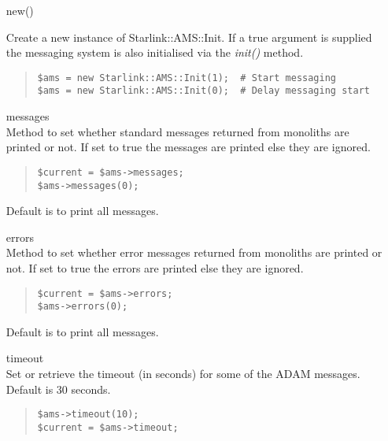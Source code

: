 \documentclass[twoside,11pt]{article}
\newenvironment{myquote}{\begin{quote}\begin{small}}{\end{small}\end{quote}}
\renewcommand{\_}{\texttt{\symbol{95}}}
\begin{document}
\begin{itemize}

\item[new()]%
%

Create a new instance of Starlink::AMS::Init.
If a true argument is supplied the messaging system is also
initialised via the {\em init()\/} method.

\begin{myquote}
\begin{verbatim}
$ams = new Starlink::AMS::Init(1);  # Start messaging
$ams = new Starlink::AMS::Init(0);  # Delay messaging start
\end{verbatim}
\end{myquote}


\item[messages]%
%
\hfil\\
Method to set whether standard messages returned from monoliths
are printed or not. If set to true the messages are printed
else they are ignored.

\begin{myquote}
\begin{verbatim}
$current = $ams->messages;
$ams->messages(0);
\end{verbatim}
\end{myquote}

Default is to print all messages.

\item[errors]%
%
\hfil\\
Method to set whether error messages returned from monoliths
are printed or not. If set to true the errors are printed
else they are ignored.
\begin{myquote}
\begin{verbatim}
$current = $ams->errors;
$ams->errors(0);
\end{verbatim}
\end{myquote}

Default is to print all messages.

\item[timeout]%
%
\hfil\\
Set or retrieve the timeout (in seconds) for some of the ADAM messages.
Default is 30 seconds.
\begin{myquote}
\begin{verbatim}
$ams->timeout(10);
$current = $ams->timeout;
\end{verbatim}
\end{myquote}


\end{itemize}
\end{document}
